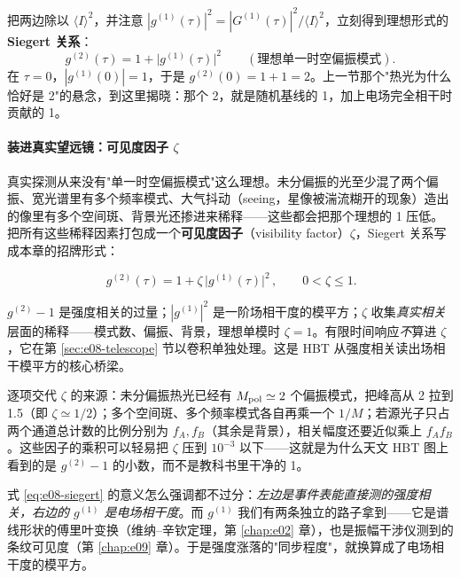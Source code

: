 把两边除以 \(\langle I\rangle^2\)，并注意 \(|g^{(1)}(\tau)|^2=|G^{(1)}(\tau)|^2/\langle I\rangle^2\)，立刻得到理想形式的 \textbf{Siegert 关系}：
\[
  g^{(2)}(\tau)=1+\big|g^{(1)}(\tau)\big|^2 \qquad(\text{理想单一时空偏振模式}).
\]
在 \(\tau=0\)，\(|g^{(1)}(0)|=1\)，于是 \(g^{(2)}(0)=1+1=2\)。上一节那个"热光为什么恰好是 2"的悬念，到这里揭晓：那个 2，就是随机基线的 1，加上电场完全相干时贡献的 1。

\paragraph{装进真实望远镜：可见度因子 \texorpdfstring{$\zeta$}{zeta}}
\label{sec:e08-zeta}

真实探测从来没有"单一时空偏振模式"这么理想。未分偏振的光至少混了两个偏振、宽光谱里有多个频率模式、大气抖动（seeing，星像被湍流糊开的现象）造出的像里有多个空间斑、背景光还掺进来稀释——这些都会把那个理想的 1 压低。把所有这些稀释因素打包成一个\textbf{可见度因子}（visibility factor）\(\zeta\)，Siegert 关系写成本章的招牌形式：

\begin{equation}
  \boxed{\,g^{(2)}(\tau)=1+\zeta\,\big|g^{(1)}(\tau)\big|^2\,},
  \qquad 0<\zeta\le1 .
  \label{eq:e08-siegert}
\end{equation}
\begin{formulaexplain}
\(g^{(2)}-1\) 是强度相关的过量；\(|g^{(1)}|^2\) 是一阶场相干度的模平方；\(\zeta\) 收集\emph{真实相关}层面的稀释——模式数、偏振、背景，理想单模时 \(\zeta=1\)。有限时间响应\emph{不}算进 \(\zeta\)，它在第 \ref{sec:e08-telescope} 节以卷积单独处理。这是 HBT 从强度相关读出场相干模平方的核心桥梁。
\end{formulaexplain}

逐项交代 \(\zeta\) 的来源：未分偏振热光已经有 \(M_{\rm pol}\simeq2\) 个偏振模式，把峰高从 2 拉到 1.5（即 \(\zeta\simeq1/2\)）；多个空间斑、多个频率模式各自再乘一个 \(1/M\)；若源光子只占两个通道总计数的比例分别为 \(f_A,f_B\)（其余是背景），相关幅度还要近似乘上 \(f_Af_B\)。这些因子的乘积可以轻易把 \(\zeta\) 压到 \(10^{-3}\) 以下——这就是为什么天文 HBT 图上看到的是 \(g^{(2)}-1\) 的小数，而不是教科书里干净的 1。

式 \eqref{eq:e08-siegert} 的意义怎么强调都不过分：\emph{左边是事件表能直接测的强度相关，右边的 \(g^{(1)}\) 是电场相干度}。而 \(g^{(1)}\) 我们有两条独立的路子拿到——它是谱线形状的傅里叶变换（维纳--辛钦定理，第 \ref{chap:e02} 章），也是振幅干涉仪测到的条纹可见度（第 \ref{chap:e09} 章）。于是强度涨落的"同步程度"，就换算成了电场相干度的模平方。

